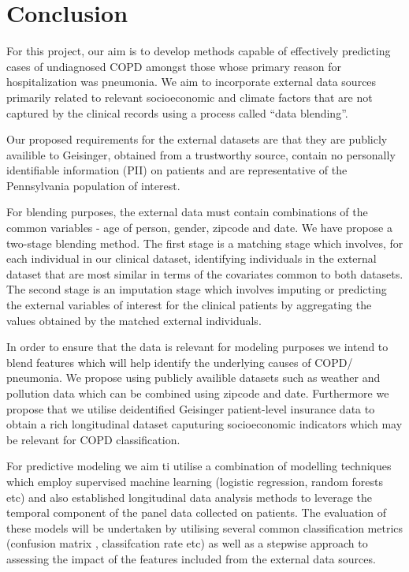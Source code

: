 \documentclass{article}
\begin{document}
\section{Conclusion}
For this project, our aim is to develop methods capable of effectively 
predicting cases of undiagnosed COPD amongst those whose primary reason for 
hospitalization was pneumonia. We aim to incorporate external data sources 
primarily related to relevant socioeconomic and climate factors that 
are not captured by the clinical records using a process called ``data blending''.

Our proposed requirements for the external datasets are that they are publicly
availible to Geisinger, obtained from a trustworthy source, contain no personally 
identifiable information (PII) on patients and are representative of the 
Pennsylvania population of interest.

For blending purposes, the external data must contain combinations of the common
variables - age of person, gender, zipcode and date. We have propose a two-stage 
blending method. The first stage is a matching stage which involves, for each 
individual in our clinical dataset, identifying individuals in the external 
dataset that are most similar in terms of the covariates common to both datasets. 
The second stage is an imputation stage which involves imputing or predicting 
the external variables of interest for the clinical patients by aggregating the 
values obtained by the matched external individuals.

In order to ensure that the data is relevant for modeling purposes we intend to 
blend features which will help identify the underlying causes of COPD/ pneumonia. 
We propose using publicly availible datasets such as weather and pollution data 
which can be combined using zipcode and date. Furthermore we propose that we utilise
deidentified Geisinger patient-level insurance data to obtain a rich longitudinal dataset    
caputuring socioeconomic indicators which may be relevant for COPD classification.

For predictive modeling we aim ti utilise a combination of modelling techniques
which employ supervised machine learning (logistic regression, random forests etc) 
and also established longitudinal data analysis methods to leverage the temporal 
component of the panel data collected on patients. The evaluation of these 
models will be undertaken by utilising several common classification metrics (confusion matrix
, classifcation rate etc) as well as a stepwise approach to assessing the 
impact of the features included from the external data sources.
\end{document}
